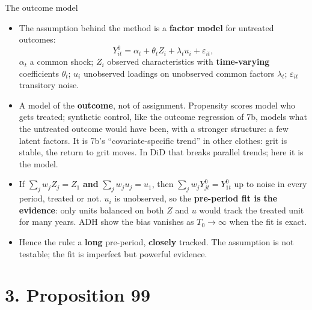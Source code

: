 \documentclass[
  11pt,
  ignorenonframetext,
  aspectratio=169,
]{beamer}
\providecommand{\tightlist}{%
  \setlength{\itemsep}{0pt}\setlength{\parskip}{0pt}}
\begin{document}
\begin{frame}{The outcome model}
\protect{}\label{the-outcome-model}
\begin{itemize}
\tightlist
\item
  The assumption behind the method is a \textbf{factor model} for
  untreated outcomes: \[
  Y^0_{it} = \alpha_t + \theta_t Z_i + \lambda_t u_i + \varepsilon_{it},
  \] \(\alpha_t\) a common shock; \(Z_i\) observed characteristics with
  \textbf{time-varying} coefficients \(\theta_t\); \(u_i\) unobserved
  loadings on unobserved common factors \(\lambda_t\);
  \(\varepsilon_{it}\) transitory noise.
\item
  A model of the \textbf{outcome}, not of assignment. Propensity scores
  model who gets treated; synthetic control, like the outcome regression
  of 7b, models what the untreated outcome would have been, with a
  stronger structure: a few latent factors. It is 7b's
  ``covariate-specific trend'' in other clothes: grit is stable, the
  return to grit moves. In DiD that breaks parallel trends; here it is
  the model.
\item
  If \(\sum_j w_j Z_j = Z_1\) \textbf{and} \(\sum_j w_j u_j = u_1\),
  then \(\sum_j w_j Y^0_{jt} = Y^0_{1t}\) up to noise in every period,
  treated or not. \(u_i\) is unobserved, so the \textbf{pre-period fit
  is the evidence}: only units balanced on both \(Z\) and \(u\) would
  track the treated unit for many years. ADH show the bias vanishes as
  \(T_0 \to \infty\) when the fit is exact.
\item
  Hence the rule: a \textbf{long} pre-period, \textbf{closely} tracked.
  The assumption is not testable; the fit is imperfect but powerful
  evidence.
\end{itemize}
\end{frame}

\section{3. Proposition 99}\label{proposition-99}
\end{document}
